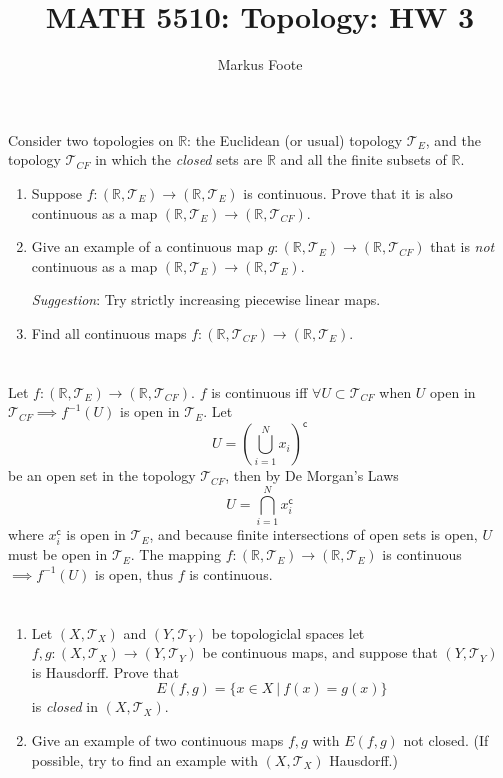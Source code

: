 \documentclass{jhwhw}
\title{MATH 5510: Topology: HW 3}
\author{Markus Foote}
\newcommand{\R}{{\mathbb R}}
\newcommand{\T}{{\mathcal T}}
\begin{document}
\problem{}%
 Consider two topologies on $\R$:  the Euclidean (or usual) topology $\T_E$, and the topology $\T_{CF}$ in which the \emph{closed} sets are $\R$ and all the finite subsets of $\R$.
 
 \begin{enumerate}
 	
 	\item Suppose $f:(\R,\T_E)\to (\R,\T_E)$ is continuous.  Prove that it is also continuous as a map $(\R,\T_E) \to (\R,\T_{CF})$.
 	
 	\item Give an example of  a continuous map $g:(\R,\T_E)\to (\R,\T_{CF})$ that is \emph{not} continuous as a map $(\R,\T_E)\to (\R,\T_E)$.
 	
 	\emph{Suggestion}:  Try strictly increasing piecewise linear maps.
 	
 	\item Find all continuous maps $f:(\R,\T_{CF})\to (\R,\T_E)$.
 \end{enumerate}
\solution{}
\part{}
Let $f: (\R,\T_E)\to(\R,\T_{CF})$. $f$ is continuous iff $\forall U \subset \T_{CF}$ when $U$ open in $\T_{CF} \implies f^{-1}(U)$ is open in $\T_E$.
Let $$U = \left(\bigcup\limits_{i=1}^{N} x_i\right) ^{\mathsf{c}} $$ be an open set in the topology $\T_{CF}$, then by De Morgan's Laws $$ U = \bigcap\limits_{i=1}^{N}x_i^{\mathsf{c}}$$ where $x_i^{\mathsf{c}}$ is open in $\T_E$, and because finite intersections of open sets is open, $U$ must be open in $\T_E$. The mapping $f:(\R,\T_E)\to(\R,\T_E)$ is continuous $\implies f^{-1}(U)$ is open, thus $f$ is continuous. 

\part{}



\part{}

\problem{} %
\begin{enumerate}
	\item Let $(X,\T_X)$ and $(Y,\T_Y)$ be topologiclal spaces let $f,g:(X,\T_X)\to(Y,\T_Y)$ be continuous maps, and suppose that $(Y,\T_Y)$ is Hausdorff.   Prove that
	$$
	E(f,g) = \{x\in X \  | \  f(x) = g(x) \}
	$$
	is \emph{closed} in $(X,\T_X)$.
	\item Give an example of two continuous maps $f,g$ with $E(f,g)$ not closed.  (If possible, try to find an example with $(X,\T_X)$ 
	Hausdorff.)
\end{enumerate}
\end{document}
